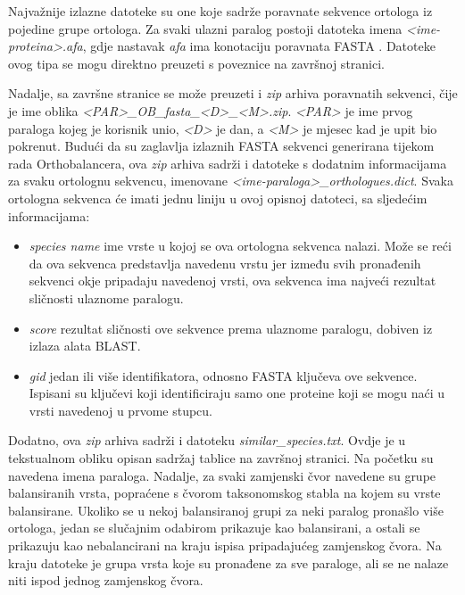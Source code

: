 Najvažnije izlazne datoteke su one koje sadrže poravnate sekvence ortologa iz
pojedine grupe ortologa. Za svaki ulazni paralog postoji datoteka imena
\emph{<ime-proteina>.afa}, gdje nastavak \emph{afa} ima konotaciju poravnata
FASTA . Datoteke ovog tipa se mogu direktno preuzeti s
poveznice na završnoj stranici.

Nadalje, sa završne stranice se može preuzeti i \emph{zip} arhiva poravnatih
sekvenci, čije je ime oblika \emph{<PAR>\_OB\_fasta\_<D>\_<M>.zip}. \emph{<PAR>}
je ime prvog paraloga kojeg je korisnik unio, \emph{<D>} je dan, a \emph{<M>} je
mjesec kad je upit bio pokrenut. Budući da su zaglavlja izlaznih FASTA
sekvenci generirana tijekom rada Orthobalancera, ova \emph{zip} arhiva sadrži i
datoteke s dodatnim informacijama za svaku ortolognu sekvencu, imenovane
\emph{<ime-paraloga>\_orthologues.dict}. Svaka ortologna sekvenca će imati jednu
liniju u ovoj opisnoj datoteci, sa sljedećim informacijama:

\begin{itemize}

    \item \emph{species name} ime vrste u kojoj se ova ortologna sekvenca
nalazi. Može se reći da ova sekvenca predstavlja navedenu vrstu jer između svih
pronađenih sekvenci okje pripadaju navedenoj vrsti, ova sekvenca ima najveći
rezultat sličnosti ulaznome paralogu.

    \item \emph{score} rezultat sličnosti ove sekvence prema ulaznome paralogu,
dobiven iz izlaza alata BLAST.

    \item \emph{gid} jedan ili više identifikatora, odnosno FASTA ključeva ove
sekvence. Ispisani su ključevi koji identificiraju samo one proteine koji se
mogu naći u vrsti navedenoj u prvome stupcu.

\end{itemize}
Dodatno, ova \emph{zip} arhiva sadrži i datoteku \emph{similar\_species.txt}.
Ovdje je u tekstualnom obliku opisan sadržaj tablice na završnoj stranici. Na
početku su navedena imena paraloga. Nadalje, za svaki zamjenski čvor navedene su
grupe balansiranih vrsta, popraćene s čvorom taksonomskog stabla na kojem su
vrste balansirane. Ukoliko se u nekoj balansiranoj grupi za neki paralog
pronašlo više ortologa, jedan se slučajnim odabirom prikazuje kao balansirani, a
ostali se prikazuju kao nebalancirani  na kraju ispisa
pripadajućeg zamjenskog čvora. Na kraju datoteke je grupa vrsta koje su
pronađene za sve paraloge, ali se ne nalaze niti ispod jednog zamjenskog čvora.

